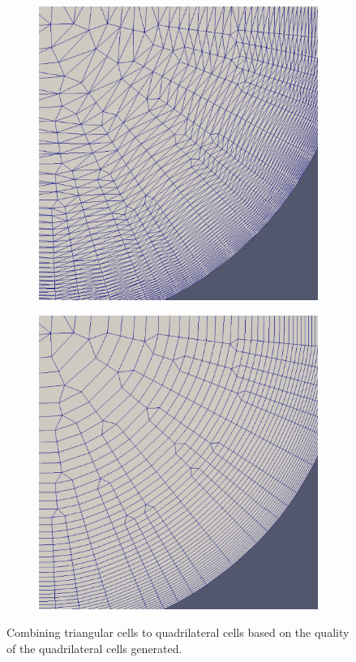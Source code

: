 \documentclass[conf]{new-aiaa}
\begin{document}
\begin{figure}
\centering
\begin{subfigure}{0.5\textwidth}
\includegraphics[width=0.9\linewidth]{combine-tris-to-quads/combineTrisToQuads1.eps}
\caption{}
\label{fig-triQuad1}
\end{subfigure}%
\begin{subfigure}{0.5\textwidth}
\includegraphics[width =0.9\linewidth]{combine-tris-to-quads/combineTrisToQuads2.eps}
\caption{}
\label{fig-triQuad2}
\end{subfigure}
\caption{Combining triangular cells to quadrilateral cells based on the quality of the quadrilateral cells generated.}
\label{fig-triQuad}
\end{figure}
\end{document}
